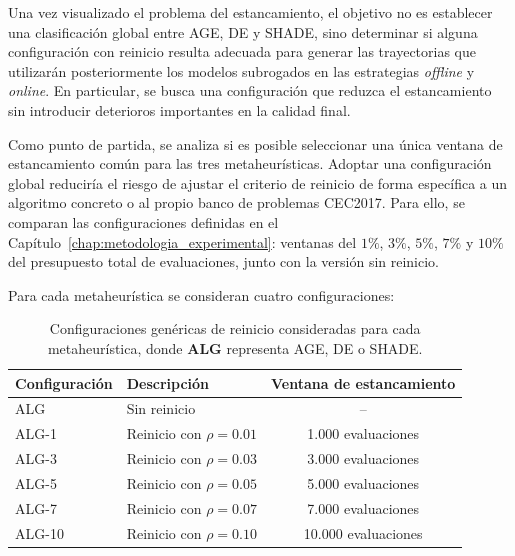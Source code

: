 Una vez visualizado el problema del estancamiento, el objetivo no es establecer una clasificación global entre AGE, DE y SHADE, sino determinar si alguna configuración con reinicio resulta adecuada para generar las trayectorias que utilizarán posteriormente los modelos subrogados en las estrategias \textit{offline} y \textit{online}. En particular, se busca una configuración que reduzca el estancamiento sin introducir deterioros importantes en la calidad final.

Como punto de partida, se analiza si es posible seleccionar una única ventana de estancamiento común para las tres metaheurísticas. Adoptar una configuración global reduciría el riesgo de ajustar el criterio de reinicio de forma específica a un algoritmo concreto o al propio banco de problemas CEC2017. Para ello, se comparan las configuraciones definidas en el
Capítulo~\ref{chap:metodologia_experimental}: ventanas del \(1\%\), \(3\%\),
\(5\%\), \(7\%\) y \(10\%\) del presupuesto total de evaluaciones, junto con la versión sin reinicio.

Para cada metaheurística se consideran cuatro configuraciones:

\begin{table}[H]
    \centering
    \begin{tabular}{llc}
        \toprule
        \textbf{Configuración} & \textbf{Descripción}       & \textbf{Ventana de estancamiento} \\
        \midrule
        ALG                    & Sin reinicio               & --                                \\
        ALG-1                  & Reinicio con \(\rho=0.01\) & 1.000 evaluaciones                \\
        ALG-3                  & Reinicio con \(\rho=0.03\) & 3.000 evaluaciones                \\
        ALG-5                  & Reinicio con \(\rho=0.05\) & 5.000 evaluaciones                \\
        ALG-7                  & Reinicio con \(\rho=0.07\) & 7.000 evaluaciones                \\
        ALG-10                 & Reinicio con \(\rho=0.10\) & 10.000 evaluaciones               \\
        \bottomrule
    \end{tabular}
    \caption[Configuraciones genéricas de reinicio consideradas para cada metaheurística.]{Configuraciones genéricas de reinicio consideradas para cada metaheurística, donde \textbf{ALG} representa AGE, DE o SHADE.}
    \label{tab:configuraciones_reinicio_genericas}
\end{table}

